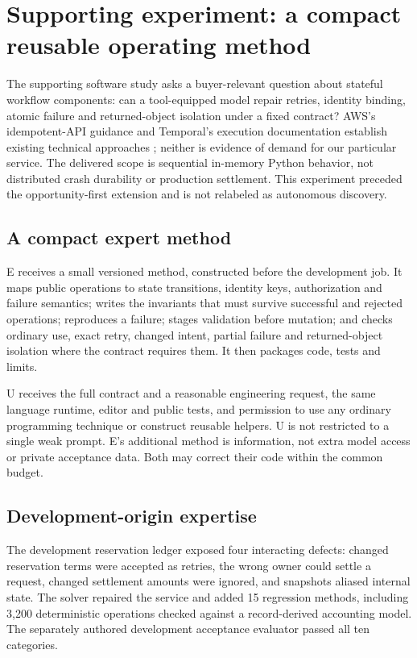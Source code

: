 \documentclass[11pt,letterpaper]{article}
\begin{document}
\section{Supporting experiment: a compact reusable operating method}
The supporting software study asks a buyer-relevant question about stateful workflow components: can a tool-equipped model repair retries, identity binding, atomic failure and returned-object isolation under a fixed contract? AWS's idempotent-API guidance and Temporal's execution documentation establish existing technical approaches \cite{aws,temporal}; neither is evidence of demand for our particular service. The delivered scope is sequential in-memory Python behavior, not distributed crash durability or production settlement. This experiment preceded the opportunity-first extension and is not relabeled as autonomous discovery.

\subsection{A compact expert method}
E receives a small versioned method, constructed before the development job. It maps public operations to state transitions, identity keys, authorization and failure semantics; writes the invariants that must survive successful and rejected operations; reproduces a failure; stages validation before mutation; and checks ordinary use, exact retry, changed intent, partial failure and returned-object isolation where the contract requires them. It then packages code, tests and limits.

U receives the full contract and a reasonable engineering request, the same language runtime, editor and public tests, and permission to use any ordinary programming technique or construct reusable helpers. U is not restricted to a single weak prompt. E's additional method is information, not extra model access or private acceptance data. Both may correct their code within the common budget.

\subsection{Development-origin expertise}
The development reservation ledger exposed four interacting defects: changed reservation terms were accepted as retries, the wrong owner could settle a request, changed settlement amounts were ignored, and snapshots aliased internal state. The solver repaired the service and added 15 regression methods, including 3,200 deterministic operations checked against a record-derived accounting model. The separately authored development acceptance evaluator passed all ten categories.
\end{document}
